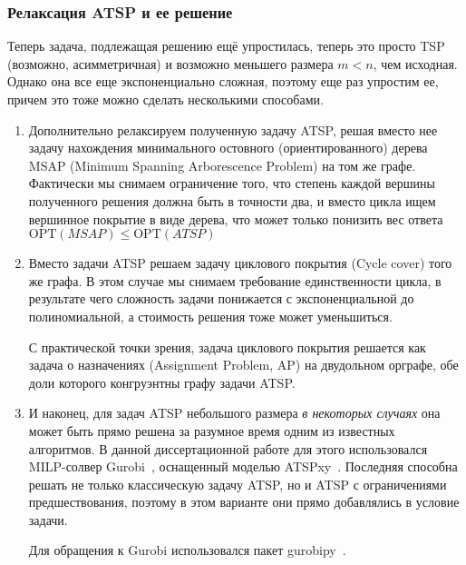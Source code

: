 \subsubsection{Релаксация ATSP и ее решение}
Теперь задача,
подлежащая решению ещё упростилась,
теперь это просто TSP
(возможно, асимметричная)
и возможно меньшего размера $m<n$,
чем исходная.
Однако она все еще экспоненциально сложная,
поэтому еще раз упростим ее,
причем это тоже можно сделать несколькими способами.

\begin{enumerate}
  \item
  Дополнительно релаксируем полученную задачу ATSP,
  решая вместо нее задачу нахождения
  минимального остовного (ориентированного) дерева
  MSAP
  (Minimum Spanning Arborescence Problem)
  на том же графе.
  Фактически мы снимаем ограничение того,
  что степень каждой вершины полученного решения должна
  быть в точности два,
  и вместо цикла ищем вершинное покрытие
  в виде дерева,
  что может только понизить вес ответа
  $\mathrm{OPT}(MSAP) \leqslant \mathrm{OPT}(ATSP)$
  \item
  Вместо задачи ATSP решаем задачу циклового покрытия
  (Cycle cover) того же графа.
  В этом случае мы снимаем требование единственности цикла,
  в результате чего сложность задачи понижается с экспоненциальной
  до полиномиальной,
  а стоимость решения тоже может уменьшиться.

  С практической точки зрения,
  задача циклового покрытия решается как
  задача о назначениях
  (Assignment Problem, AP)
  на двудольном орграфе,
  обе доли которого конгруэнтны
  графу задачи ATSP.
  \item
  И наконец,
  для задач ATSP
  небольшого размера
  \textit{в некоторых случаях}
  она может быть прямо решена
  за разумное время одним
  из известных алгоритмов.
  В данной диссертационной работе
  для этого использовался MILP-солвер
  Gurobi~\cite{bi:Gurobi},
  оснащенный моделью
  ATSPxy~\autocite{SARIN2005}.
  Последняя способна решать не только
  классическую задачу ATSP,
  но и ATSP с ограничениями предшествования,
  поэтому в этом варианте они прямо
  добавлялись в условие задачи.

  Для обращения к Gurobi
  использовался пакет gurobipy~\cite{bi:GurobiPy}.

\end{enumerate}

